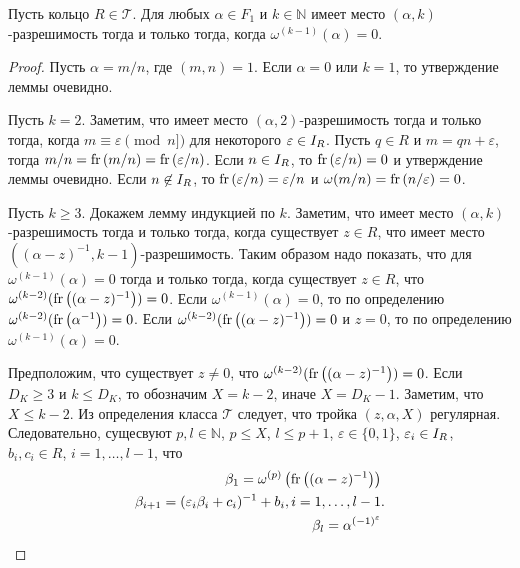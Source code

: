 \documentclass[_00_dissertation.tex]{subfiles}
\begin{document}
\begin{lemma}\label{lemma:omega_and_euclidean_algorithm}
    Пусть кольцо $R \in \mathcal{T}$.
    Для любых $\alpha \in F_1$ и $k \in \mathbb{N}$ имеет место $(\alpha, k)$-разрешимость тогда и только тогда, когда $\omega^{(k-1)}(\alpha) = 0$.
\end{lemma}
\begin{proof}
    Пусть $\alpha = m/n$, где $(m, n) = 1$.
    Если $\alpha = 0$ или $k = 1$, то утверждение леммы очевидно.

    Пусть $k = 2$.
    Заметим, что имеет место $(\alpha, 2)$-разрешимость тогда и только тогда, когда $m \equiv \varepsilon \pmod{n]}$ для некоторого $\varepsilon \in I_{R}$.
    Пусть $q \in R$ и $m = qn + \varepsilon$, тогда $m/n = \textrm{fr}\left(m/n\right) = \textrm{fr}\left(\varepsilon/n\right)$.
    Если $n \in I_{R}$, то $\textrm{fr}\left(\varepsilon/n\right) = 0$ и утверждение леммы очевидно.
    Если $n \not\in I_{R}$, то $\textrm{fr}\left(\varepsilon/n\right) = \varepsilon/n$ и $\omega(m/n) = \textrm{fr}\left(n/\varepsilon\right) = 0$.

    Пусть $k \ge 3$.
    Докажем лемму индукцией по $k$.
    Заметим, что имеет место $(\alpha, k)$-разрешимость тогда и только тогда, когда существует $z \in R$, что имеет место $((\alpha - z)^{-1}, k-1)$-разрешимость.
    Таким образом надо показать, что для $\omega^{(k-1)}(\alpha) = 0$ тогда и только тогда, когда существует $z \in R$, что $\omega^{(k-2)}(\textrm{fr}\left((\alpha - z)^{-1}\right)) = 0$.
    Если $\omega^{(k-1)}(\alpha) = 0$, то по определению $\omega^{(k-2)}(\textrm{fr}\left(\alpha^{-1}\right)) = 0$.
    Если $\omega^{(k-2)}(\textrm{fr}\left((\alpha - z)^{-1}\right)) = 0$ и $z = 0$, то по определению $\omega^{(k-1)}(\alpha) = 0$.

    Предположим, что существует $z \neq 0$, что $\omega^{(k-2)}(\textrm{fr}\left((\alpha - z)^{-1}\right)) = 0$.
    Если $D_K \ge 3$ и $k \le D_K$, то обозначим $X = k-2$, иначе $X = D_K - 1$.
    Заметим, что $X \le k-2$.
    Из определения класса $\mathcal{T}$ следует, что тройка $(z, \alpha, X)$ регулярная.
    Следовательно, сущесвуют $p, l \in \mathbb{N}$, $p \le X$, $l \le p+1$, $\varepsilon \in \{0, 1\}$, $\varepsilon_i \in I_{R}$, $b_i, c_i \in R$, $i = 1, \dots, l-1$, что
    \begin{equation*}
        \begin{split}
            \beta_1 = \omega^{(p)}\left(\textrm{fr}\left((\alpha - z)^{-1}\right)\right)\\
            \beta_{i+1} = (\varepsilon_i \beta_i + c_i)^{-1} + b_i, i = 1, \dots, l-1\\
            \beta_{l} = \alpha^{(-1)^{\varepsilon}}
        \end{split}.
    \end{equation*}


\end{proof}
\end{document}
